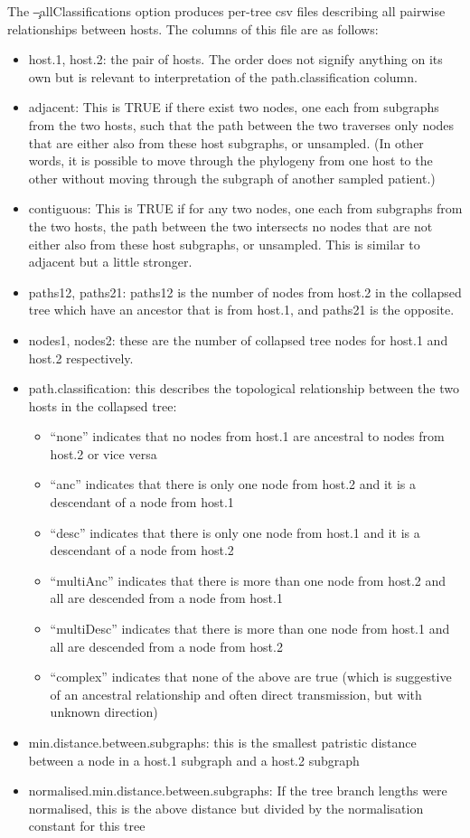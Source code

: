 The \c{--allClassifications} option produces per-tree csv files describing all pairwise relationships between hosts.
The columns of this file are as follows:
\begin{itemize}
\item host.1, host.2: the pair of hosts.
The order does not signify anything on its own but is relevant to interpretation of the path.classification column.
\item adjacent: This is TRUE if there exist two nodes, one each from subgraphs from the two hosts, such that the path between the two traverses only nodes that are either also from these host subgraphs, or unsampled.
(In other words, it is possible to move through the phylogeny from one host to the other without moving through the subgraph of another sampled patient.)
\item contiguous: This is TRUE if for any two nodes, one each from subgraphs from the two hosts, the path between the two intersects no nodes that are not either also from these host subgraphs, or unsampled.
This is similar to adjacent but a little stronger.
\item paths12, paths21: paths12 is the number of nodes from host.2 in the collapsed tree which have an ancestor that is from host.1, and paths21 is the opposite.
\item nodes1, nodes2: these are the number of collapsed tree nodes for host.1 and host.2 respectively.
\item path.classification: this describes the topological relationship between the two hosts in the collapsed tree: \begin{itemize}                                                                                                                    
\item ``none'' indicates that no nodes from host.1 are ancestral to nodes from host.2 or vice versa
\item ``anc'' indicates that there is only one node from host.2 and it is a descendant of a node from host.1
\item ``desc'' indicates that there is only one node from host.1 and it is a descendant of a node from host.2
\item ``multiAnc'' indicates that there is more than one node from host.2 and all are descended from a node from host.1
\item ``multiDesc'' indicates that there is more than one node from host.1 and all are descended from a node from host.2
\item ``complex'' indicates that none of the above are true (which is suggestive of an ancestral relationship and often direct transmission, but with unknown direction)
\end{itemize}
\item min.distance.between.subgraphs: this is the smallest  patristic distance between a node in a host.1 subgraph and a host.2 subgraph
\item normalised.min.distance.between.subgraphs: If the tree branch lengths were normalised, this is the above distance but divided by the normalisation constant for this tree
\end{itemize}

